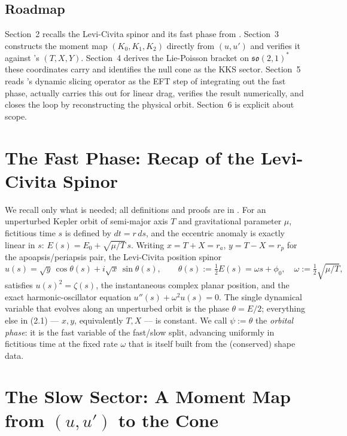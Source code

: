 \documentclass[11pt]{amsart}
\theoremstyle{remark}
\begin{document}
\subsection*{Roadmap} Section~2 recalls the Levi-Civita spinor and its fast phase from \cite{Ebert2026LeviCivita}. Section~3 constructs the moment map $(K_0,K_1,K_2)$ directly from $(u,u')$ and verifies it against \cite{Ebert2026Cone}'s $(T,X,Y)$. Section~4 derives the Lie-Poisson bracket on $\mathfrak{so}(2,1)^*$ these coordinates carry and identifies the null cone as the KKS sector. Section~5 reads \cite{Ebert2026Cone}'s dynamic slicing operator as the EFT step of integrating out the fast phase, actually carries this out for linear drag, verifies the result numerically, and closes the loop by reconstructing the physical orbit. Section~6 is explicit about scope.

\section{The Fast Phase: Recap of the Levi-Civita Spinor}

We recall only what is needed; all definitions and proofs are in \cite{Ebert2026LeviCivita}. For an unperturbed Kepler orbit of semi-major axis $T$ and gravitational parameter $\mu$, fictitious time $s$ is defined by $dt=r\,ds$, and the eccentric anomaly is exactly linear in $s$: $E(s)=E_0+\sqrt{\mu/T}\,s$. Writing $x=T+X=r_a$, $y=T-X=r_p$ for the apoapsis/periapsis pair, the Levi-Civita position spinor
\begin{equation}
u(s)=\sqrt y\,\cos\theta(s)+i\sqrt x\,\sin\theta(s),\qquad \theta(s):=\tfrac12E(s)=\omega s+\phi_0,\quad \omega:=\tfrac12\sqrt{\mu/T}, \tag{2.1}
\end{equation}
satisfies $u(s)^2=\zeta(s)$, the instantaneous complex planar position, and the exact harmonic-oscillator equation $u''(s)+\omega^2u(s)=0$. The single dynamical variable that evolves along an unperturbed orbit is the phase $\theta=E/2$; everything else in (2.1) --- $x,y$, equivalently $T,X$ --- is constant. We call $\psi:=\theta$ the \emph{orbital phase}: it is the fast variable of the fast/slow split, advancing uniformly in fictitious time at the fixed rate $\omega$ that is itself built from the (conserved) shape data.

\section{The Slow Sector: A Moment Map from \texorpdfstring{$(u,u')$}{(u,u')} to the Cone}
\end{document}
